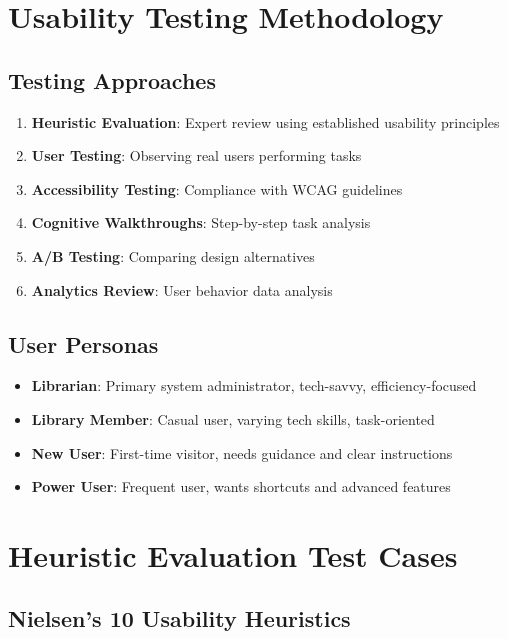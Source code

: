 \documentclass[12pt,a4paper]{article}
\begin{document}
\section{Usability Testing Methodology}

\subsection{Testing Approaches}
\begin{enumerate}
    \item \textbf{Heuristic Evaluation}: Expert review using established usability principles
    \item \textbf{User Testing}: Observing real users performing tasks
    \item \textbf{Accessibility Testing}: Compliance with WCAG guidelines
    \item \textbf{Cognitive Walkthroughs}: Step-by-step task analysis
    \item \textbf{A/B Testing}: Comparing design alternatives
    \item \textbf{Analytics Review}: User behavior data analysis
\end{enumerate}

\subsection{User Personas}
\begin{itemize}
    \item \textbf{Librarian}: Primary system administrator, tech-savvy, efficiency-focused
    \item \textbf{Library Member}: Casual user, varying tech skills, task-oriented
    \item \textbf{New User}: First-time visitor, needs guidance and clear instructions
    \item \textbf{Power User}: Frequent user, wants shortcuts and advanced features
\end{itemize}

\section{Heuristic Evaluation Test Cases}

\subsection{Nielsen's 10 Usability Heuristics}
\end{document}
